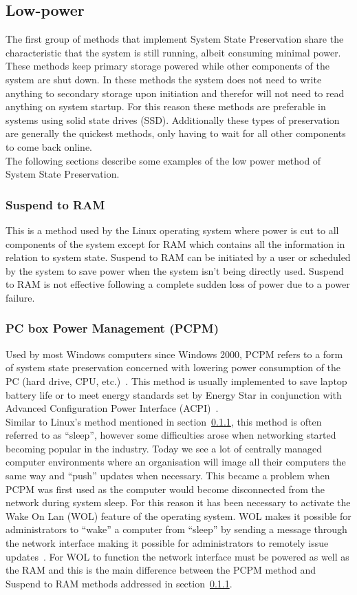 \documentclass[a4paper,12pt]{article}
\begin{document}
\subsection{Low-power}\label{sec:lowpower}
The first group of methods that implement System State Preservation share the characteristic that the system is still running, albeit consuming minimal power. These methods keep primary storage powered while other components of the system are shut down. In these methods the system does not need to write anything to secondary storage upon initiation and therefor will not need to read anything on system startup. For this reason these methods are preferable in systems using solid state drives (SSD). Additionally these types of preservation are generally the quickest methods, only having to wait for all other components to come back online.
\\The following sections describe some examples of the low power method of System State Preservation.

\subsubsection{Suspend to RAM}\label{sec:stRam}
This is a method used by the Linux operating system where power is cut to all components of the system except for RAM which contains all the information in relation to system state.\citep{Wiki}
Suspend to RAM can be initiated by a user or scheduled by the system to save power when the system isn't being directly used. Suspend to RAM is not effective following a complete sudden loss of power due to a power failure.
\subsubsection{PC box Power Management (PCPM)}\label{sec:PCPM}
Used by most Windows computers since Windows 2000, PCPM refers to a form of system state preservation concerned with lowering power consumption of the PC (hard drive, CPU, etc.)~\citep{PCPM}. This method is usually implemented to save laptop battery life or to meet energy standards set by Energy Star in conjunction with Advanced Configuration Power Interface (ACPI)~\citep{PCPM}.
\\
Similar to Linux's method mentioned in section~\ref{sec:stRam}, this method is often referred to as ``sleep'', however some difficulties arose when networking started becoming popular in the industry. Today we see a lot of centrally managed computer environments where an organisation will image all their computers the same way and ``push'' updates when necessary. This became a problem when PCPM was first used as the computer would become disconnected from the network during system sleep. 
For this reason it has been necessary to activate the Wake On Lan (WOL) feature of the operating system. WOL makes it possible for administrators to ``wake'' a computer from ``sleep'' by sending a message through the network interface making it possible for administrators to remotely issue updates~\citep{WOL}. For WOL to function the network interface must be powered as well as the RAM and this is the main difference between the PCPM method and Suspend to RAM methods addressed in section~\ref{sec:stRam}.
\end{document}
